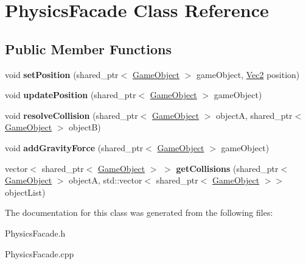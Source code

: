 \hypertarget{class_physics_facade}{}\section{Physics\+Facade Class Reference}
\label{class_physics_facade}
\subsection*{Public Member Functions}
\begin{DoxyCompactItemize}
\item 
\mbox{\label{class_physics_facade_a1a74ada6cb5fd3cac339165dbc506b8d}} 
void {\bfseries set\+Position} (shared\+\_\+ptr$<$ \mbox{\hyperlink{class_game_object}{Game\+Object}} $>$ game\+Object, \mbox{\hyperlink{struct_vec2}{Vec2}} position)
\item 
\mbox{\label{class_physics_facade_aabef1158811a4aae1bc786c7269ce794}} 
void {\bfseries update\+Position} (shared\+\_\+ptr$<$ \mbox{\hyperlink{class_game_object}{Game\+Object}} $>$ game\+Object)
\item 
\mbox{\label{class_physics_facade_a9d42e28b45cd542571e6f68cbefc41ff}} 
void {\bfseries resolve\+Collision} (shared\+\_\+ptr$<$ \mbox{\hyperlink{class_game_object}{Game\+Object}} $>$ objectA, shared\+\_\+ptr$<$ \mbox{\hyperlink{class_game_object}{Game\+Object}} $>$ objectB)
\item 
\mbox{\label{class_physics_facade_a0db40f3388826df2d9093f6a9ca90bd2}} 
void {\bfseries add\+Gravity\+Force} (shared\+\_\+ptr$<$ \mbox{\hyperlink{class_game_object}{Game\+Object}} $>$ game\+Object)
\item 
\mbox{\label{class_physics_facade_aaa92507f3546d858efdd7809f93750e1}} 
vector$<$ shared\+\_\+ptr$<$ \mbox{\hyperlink{class_game_object}{Game\+Object}} $>$ $>$ {\bfseries get\+Collisions} (shared\+\_\+ptr$<$ \mbox{\hyperlink{class_game_object}{Game\+Object}} $>$ objectA, std\+::vector$<$ shared\+\_\+ptr$<$ \mbox{\hyperlink{class_game_object}{Game\+Object}} $>$$>$ object\+List)
\end{DoxyCompactItemize}


The documentation for this class was generated from the following files\+:\begin{DoxyCompactItemize}
\item 
Physics\+Facade.\+h\item 
Physics\+Facade.\+cpp\end{DoxyCompactItemize}
